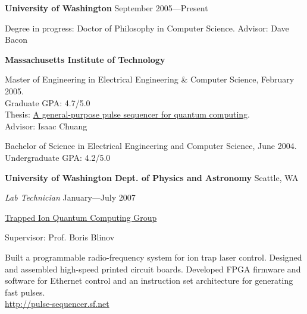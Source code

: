 \documentclass[letter]{article}
\begin{document}
{\bf University of Washington} \hspace*{\fill}September 2005---Present
\par
Degree in progress: Doctor of Philosophy in Computer Science.
Advisor: Dave Bacon
\vspace{\baselineskip}
\par

{\bf Massachusetts Institute of Technology}
\par
Master of Engineering in Electrical Engineering \& Computer Science, February 2005.\\
Graduate GPA: 4.7/5.0\\
Thesis: \href{http://sourceforge.net/project/showfiles.php?group_id=129764&package_id=144780&release_id=307201}{A general-purpose pulse sequencer for quantum computing}.\\
Advisor: Isaac Chuang\\
\par
Bachelor of Science in Electrical Engineering and Computer Science, June 2004.\\
Undergraduate GPA: 4.2/5.0
\vspace{\baselineskip}
\par

\vspace{\baselineskip}
\par
{\bf {University of Washington Dept. of Physics and Astronomy}} \hfill Seattle, WA
\par
{\em Lab Technician} \hfill January---July 2007
\par
\href{http://depts.washington.edu/qcomp/}{Trapped Ion Quantum Computing Group}
\par
Supervisor: Prof. Boris Blinov
\par
Built a programmable radio-frequency system for ion trap laser control. Designed and
assembled high-speed printed circuit boards. Developed FPGA firmware and
software for Ethernet control
and an instruction set architecture for generating fast pulses.\\
\url{http://pulse-sequencer.sf.net}

\par
\end{document}
